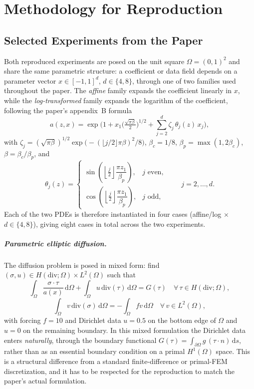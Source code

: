 \cleardoubleoddpage%
\chapter{Methodology for Reproduction}
\label{sec:methodology}

\section{Selected Experiments from the Paper}

Both reproduced experiments are posed on the unit square $\Omega = (0,1)^2$
and share the same parametric structure: a coefficient or data field
depends on a parameter vector $x \in [-1,1]^d$, $d \in \{4,8\}$, through one
of two families used throughout the paper. The \emph{affine} family
expands the coefficient linearly in $x$, while the \emph{log-transformed}
family expands the logarithm of the coefficient, following the paper's
appendix~B formula
\[
    a(z,x) = \exp\Big(1 + x_1\Big(\tfrac{\sqrt{\pi\beta}}{2}\Big)^{1/2}
    + \sum_{j=2}^{d} \zeta_j\,\theta_j(z)\,x_j\Big),
\]
with $\zeta_j = (\sqrt{\pi\beta})^{1/2}\exp\!\big(-(\lfloor j/2\rfloor\pi\beta)^2/8\big)$,
$\beta_c = 1/8$, $\beta_p = \max(1, 2\beta_c)$, $\beta = \beta_c/\beta_p$, and
\[
    \theta_j(z) =
    \begin{cases}
        \sin\!\left(\left\lfloor \tfrac{j}{2} \right\rfloor \dfrac{\pi z_1}{\beta_p}\right), & j \text{ even}, \\[6pt]
        \cos\!\left(\left\lfloor \tfrac{j}{2} \right\rfloor \dfrac{\pi z_1}{\beta_p}\right), & j \text{ odd},
    \end{cases}
    \qquad j = 2, \dots, d.
\]
Each of the two PDEs is therefore instantiated in four cases (affine/log
$\times$ $d\in\{4,8\}$), giving eight cases in total across the two
experiments.

\paragraph{Parametric elliptic diffusion.} The diffusion problem is posed
in mixed form: find $(\sigma, u) \in H(\mathrm{div};\Omega) \times L^2(\Omega)$
such that
\[
    \int_\Omega \frac{\sigma \cdot \tau}{a(x)}\,\mathrm{d}\Omega
    + \int_\Omega u\,\mathrm{div}(\tau)\,\mathrm{d}\Omega
    = G(\tau)
    \quad \forall\, \tau \in H(\mathrm{div};\Omega),
\]
\[
    \int_\Omega v\,\mathrm{div}(\sigma)\,\mathrm{d}\Omega
    = -\int_\Omega f v\,\mathrm{d}\Omega
    \quad \forall\, v \in L^2(\Omega),
\]
with forcing $f = 10$ and Dirichlet data $u = 0.5$ on the bottom edge of
$\Omega$ and $u = 0$ on the remaining boundary. In this mixed formulation
the Dirichlet data enters \emph{naturally}, through the boundary functional
$G(\tau) = \int_{\partial\Omega} g\,(\tau\cdot n)\,\mathrm{d}s$, rather than
as an essential boundary condition on a primal $H^1(\Omega)$ space. This is
a structural difference from a standard finite-difference or primal-FEM
discretization, and it has to be respected for the reproduction to match
the paper's actual formulation.

